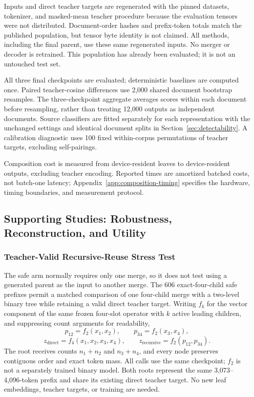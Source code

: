 \documentclass[10pt]{article}
\begin{document}
Inputs and direct teacher targets are regenerated with the pinned datasets,
tokenizer, and masked-mean teacher procedure because the evaluation tensors
were not distributed. Document-order hashes and prefix-token totals match the
published population, but tensor byte identity is not claimed. All methods,
including the final parent, use these same regenerated inputs. No merger or
decoder is retrained. This population has already been evaluated; it is not
an untouched test set.

All three final checkpoints are evaluated; deterministic baselines are
computed once. Paired teacher-cosine differences use 2,000 shared document
bootstrap resamples. The three-checkpoint aggregate averages scores within
each document before resampling, rather than treating 12,000 outputs as
independent documents. Source classifiers are fitted separately for each
representation with the unchanged settings and identical document splits in
Section~\ref{sec:detectability}. A calibration diagnostic uses 100 fixed
within-corpus permutations of teacher targets, excluding self-pairings.

Composition cost is measured from device-resident leaves to device-resident
outputs, excluding teacher encoding. Reported times are amortized batched
costs, not batch-one latency; Appendix~\ref{app:composition-timing} specifies
the hardware, timing boundaries, and measurement protocol.

\subsection{Supporting Studies: Robustness, Reconstruction, and Utility}

\subsubsection{Teacher-Valid Recursive-Reuse Stress Test}
\label{sec:recursive-reuse-protocol}

The safe arm normally requires only one merge, so it does not test using a
generated parent as the input to another merge. The 606 exact-four-child safe
prefixes permit a matched comparison of one four-child merge with a two-level
binary tree while retaining a valid direct teacher target. Writing \(f_k\) for the vector
component of the same frozen four-slot operator with \(k\) active leading
children, and suppressing count arguments for readability,
\[
 p_{12}=f_2(x_1,x_2),\qquad p_{34}=f_2(x_3,x_4),
\]
\[
 z_{\mathrm{direct}}=f_4(x_1,x_2,x_3,x_4),\qquad
 z_{\mathrm{recursive}}=f_2(p_{12},p_{34}).
\]
The root receives counts \(n_1+n_2\) and \(n_3+n_4\), and every node preserves
contiguous order and exact token mass. All calls use the same checkpoint;
\(f_2\) is not a separately trained binary model. Both roots represent the same
3,073--4,096-token prefix and share its existing direct teacher target. No
new leaf embeddings, teacher targets, or training are needed.
\end{document}
